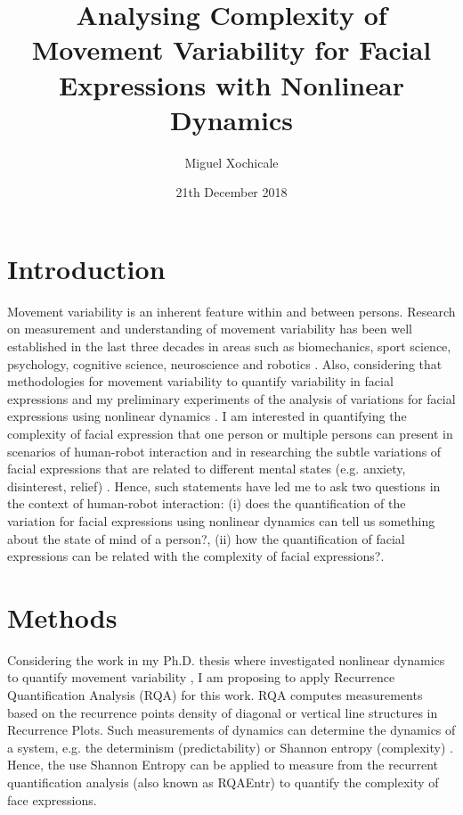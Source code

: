 \documentclass[12pt]{article}
\title{Analysing Complexity of Movement Variability 
for Facial Expressions with Nonlinear Dynamics}
\author{Miguel Xochicale\\ 
}
\date{21th December 2018}
\begin{document}
\maketitle


%


\section{Introduction}
Movement variability is an inherent feature within and between persons. 
Research on measurement and understanding of movement variability has been 
well established in the last three decades in areas such as biomechanics, 
sport science, psychology, cognitive science, neuroscience and robotics 
\cite{2018arXiv181009249X}.
Also, considering that methodologies for movement variability 
to quantify variability in facial expressions and 
my preliminary experiments of the analysis of variations 
for facial expressions using nonlinear dynamics \cite{MPXochicale_CERE2018}.
I am interested in quantifying the complexity 
of facial expression that one person or multiple persons can present in scenarios 
of human-robot interaction and  in researching 
the subtle variations of facial expressions that are related to different 
mental states  (e.g. anxiety, disinterest, relief) \cite{back2014}.
Hence, such statements have led me to ask two questions in the context
of human-robot interaction: 
(i) does the quantification of the variation for facial expressions 
using nonlinear dynamics can tell us something about the state of mind of a person?, 
(ii) how the quantification of facial expressions can be related with 
the complexity of facial expressions?.

\section{Methods}
Considering the work in my Ph.D. thesis where investigated nonlinear dynamics
to quantify movement variability \cite{XochicalePhDThesis2018},
I am proposing to apply Recurrence Quantification Analysis (RQA) for this work.
RQA computes measurements based on the recurrence points density of diagonal 
or vertical line structures in Recurrence Plots. 
Such measurements of dynamics can determine the dynamics of a system,
e.g. the determinism (predictability) or Shannon entropy (complexity) 
\cite{marwan2007}. 
Hence, the use Shannon Entropy can be applied to measure 
from the recurrent quantification analysis (also known as RQAEntr)
to quantify the complexity of face expressions. 
\end{document}
